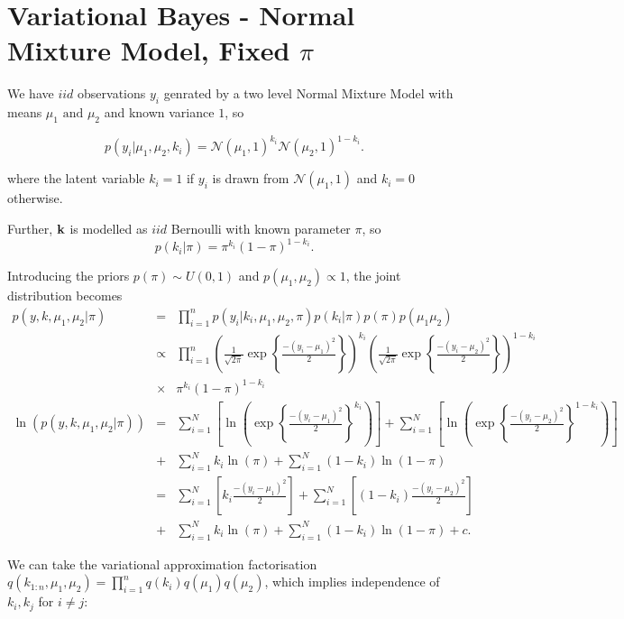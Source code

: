 \documentclass[12pt]{article}
\begin{document}



\section{Variational Bayes - Normal Mixture Model, Fixed $\pi$}

We have $iid$ observations $y_i$ genrated by a two level Normal Mixture Model with means $\mu_1 \mbox{ and } \mu_2$ and known variance $1$, so

$$p(y_i | \mu_1, \mu_2, k_i) = \mathcal{N}(\mu_1, 1)^{k_i} \mathcal{N}(\mu_2, 1)^{1-k_i}.$$

where the latent variable $k_i = 1$ if $y_i$ is drawn from $\mathcal{N}(\mu_1, 1)$ and $k_i = 0$ otherwise.

Further, $\bold{k}$ is modelled as $iid$ Bernoulli with known parameter $\pi$, so
$$p(k_i | \pi) = \pi^{k_i} (1-\pi)^{1-k_i}. $$

Introducing the priors $p(\pi) \sim U(0, 1)$ and $p(\mu_1, \mu_2) \propto 1$, the joint distribution becomes
\begin{eqnarray}
\label{1}
p(y, k, \mu_1, \mu_2 | \pi) & = & \prod^{n}_{i=1} p(y_i | k_i, \mu_1, \mu_2, \pi) p(k_i | \pi) p(\pi) p(\mu_1 \mu_2) \nonumber \\
& \propto & \prod^{n}_{i=1} \left(\frac{1}{\sqrt{2\pi}} \exp \left\{\frac{-(y_i-\mu_1)^2}{2}\right\}\right)^{k_i} \left(\frac{1}{\sqrt{2\pi}} \exp \left\{\frac{-(y_i-\mu_2)^2}{2}\right\}\right)^{1-k_i} \nonumber \\
& \times & \pi^{k_i} (1-\pi)^{1-k_i} \nonumber \\
\ln(p(y, k, \mu_1, \mu_2 | \pi)) & = & \sum_{i=1}^{N} \left[ \ln\left(\exp \left\{\frac{-(y_i-\mu_1)^2}{2}\right\}^{k_i}\right)\right] + \sum_{i=1}^{N} \left[ \ln\left(\exp \left\{\frac{-(y_i-\mu_2)^2}{2}\right\}^{1-k_i}\right)\right] \nonumber \\
& + & \sum_{i=1}^{N} k_i \ln(\pi) + \sum_{i=1}^{N} (1-k_i) \ln(1-\pi) \nonumber \\
& = & \sum_{i=1}^{N} \left[ k_{i} \frac{-(y_i-\mu_1)^2}{2}\right] + \sum_{i=1}^{N} \left[ (1-k_{i}) \frac{-(y_i-\mu_2)^2}{2}\right] \nonumber \\
& + & \sum_{i=1}^{N} k_i \ln(\pi) + \sum_{i=1}^{N} (1-k_i) \ln(1-\pi) + c.
\end{eqnarray}

We can take the variational approximation factorisation $q(k_{1:n}, \mu_1, \mu_2) = \prod_{i=1}^{n} q(k_i)q(\mu_1)q(\mu_2)$, which implies independence of $k_i, k_j$ for $i \neq j$:
\end{document}
